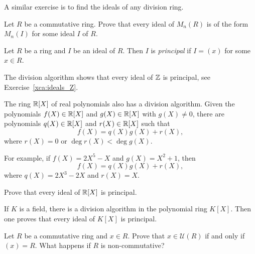 A similar exercise is to find the ideals of any division ring.  

\begin{exercise}
\label{xca:ideals_matrices}
    Let $R$ be a commutative ring. Prove that every ideal of $M_n(R)$ is 
    of the form $M_n(I)$ for some ideal $I$ of $R$. 
\end{exercise}

%    
%    


\begin{definition}
Let $R$ be a ring and $I$ be an ideal of $R$. Then $I$ is \emph{principal}
if $I=(x)$ for some $x\in R$. 	
\end{definition}

The division algorithm shows that every ideal of $\mathbb{Z}$ is principal, 
see Exercise~\ref{xca:ideals_Z}.  

The ring $\mathbb{R}[X]$ of real polynomials also has a division algorithm. Given the polynomials 
$f(X)\in\mathbb{R}[X]$ and $g(X)\in\mathbb{R}[X]$ with $g(X)\ne 0$, there are  
polynomials $q(X)\in\mathbb{R}[X]$ and $r(X)\in\mathbb{R}[X]$ such that 
\[
f(X)=q(X)g(X)+r(X),
\]
where $r(X)=0$ or $\deg r(X)<\deg g(X)$. 

For example, 
if $f(X)=2X^5-X$ and $g(X)=X^2+1$, then 
\[
f(X)=q(X)g(X)+r(X),
\]
where $q(X)=2X^3-2X$ and $r(X)=X$. 

\begin{exercise}
\label{xca:R[X]_principal}
	Prove that every ideal of $\mathbb{R}[X]$ is principal. 
\end{exercise}

If $K$ is a field, there is a division algorithm in the 
polynomial ring $K[X]$. Then one proves 
that every ideal of $K[X]$ is principal.  

\begin{exercise}
\label{xca:x_unit}
	Let $R$ be a commutative ring and $x\in R$. Prove that $x\in\mathcal{U}(R)$ if and only if
	$(x)=R$. What happens if $R$ is non-commutative?
\end{exercise}

